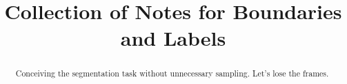 \documentclass{article}
\title{Collection of Notes for Boundaries and Labels}
\begin{document}
\maketitle

\begin{abstract}
Conceiving the segmentation task without unnecessary sampling.
Let's lose the frames.

\end{abstract}






\end{document}
